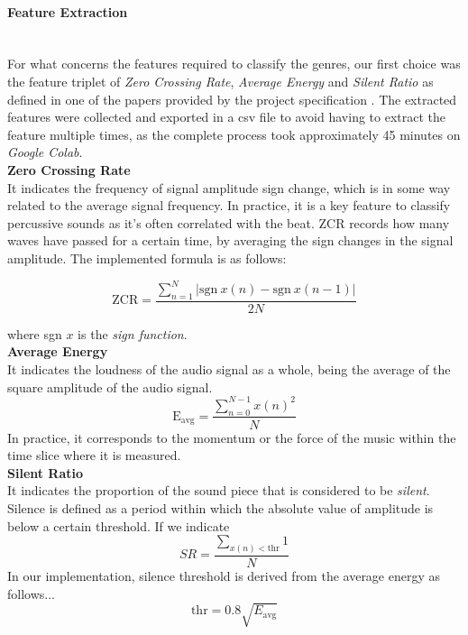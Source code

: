 \documentclass[12pt]{article}
\begin{document}
	\paragraph{Feature Extraction}\mbox{}\\\newline
	For what concerns the features required to classify the genres, our first choice was the feature triplet of \textit{Zero Crossing Rate}, \textit{Average Energy} and \textit{Silent Ratio} as defined in one of the papers provided by the project specification \cite{comparison}. The extracted features were collected and exported in a csv file to avoid having to extract the feature multiple times, as the complete process took approximately 45 minutes on \textit{Google Colab}.\\
	
	\textbf{Zero Crossing Rate}\\
	It indicates the frequency of signal amplitude sign change, which is in some way related to the average signal frequency. In practice, it is a key feature to classify percussive sounds as it's often correlated with the beat. ZCR records how many waves have passed for a certain time, by averaging the sign changes in the signal amplitude. The implemented formula is as follows:
	
	\begin{equation}
		\text{ZCR}=\dfrac{\sum_{n=1}^N{\bigg|\text{sgn}\ x(n)-\text{sgn}\ x(n-1)\bigg|}}{2N}
	\end{equation}
	
	where sgn $x$ is the \textit{sign function}.\\
	
	\textbf{Average Energy}\\
	It indicates the loudness of the audio signal as a whole, being the average of the square amplitude of the audio signal.
	\begin{equation}
		\text{E}_\text{avg}=\dfrac{\sum_{n=0}^{N-1}{x(n)^2}}{N}
	\end{equation}
	In practice, it corresponds to the momentum or the force of the music within the time slice where it is measured. \\
	
	\textbf{Silent Ratio}\\
	It indicates the proportion of the sound piece that is considered to be \textit{silent}. Silence is defined as a period within which the absolute value of amplitude is below a certain threshold. If we indicate
	\begin{equation}
		SR = \dfrac{\sum_{x(n)<\text{thr}} 1}{N}
	\end{equation}
	In our implementation, silence threshold is derived from the average energy as follows...
	\begin{equation}
		\text{thr}=0.8\sqrt{E_\text{avg}}
	\end{equation}
	\newpage
	
\end{document}

